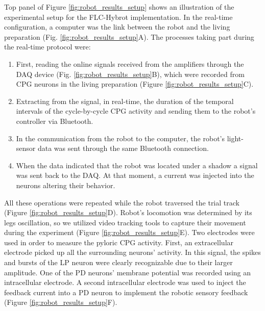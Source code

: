 Top panel of Figure \ref{fig:robot_results_setup} shows an illustration of the experimental setup for the FLC-Hybrot implementation. In the real-time configuration, a computer was the link between the robot and the living preparation (Fig. \ref{fig:robot_results_setup}A). The processes taking part during the real-time protocol were:
\begin{enumerate}
	\item First, reading the online signals received from the amplifiers through the DAQ device (Fig. \ref{fig:robot_results_setup}B), which were recorded from CPG neurons in the living preparation (Figure \ref{fig:robot_results_setup}C).
	\item Extracting from the signal, in real-time, the duration of the temporal intervals of the cycle-by-cycle CPG activity and sending them to the robot's controller via Bluetooth.
	\item In the communication from the robot to the computer, the robot's light-sensor data was sent through the same Bluetooth connection.
	\item When the data indicated that the robot was located under a shadow a signal was sent back to the DAQ. At that moment, a current was injected into the neurons altering their behavior.
\end{enumerate}

All these operations were repeated while the robot traversed the trial track (Figure \ref{fig:robot_results_setup}D). Robot's locomotion was determined by its legs oscillation, so we utilized video tracking tools to capture their movement during the experiment (Figure \ref{fig:robot_results_setup}E). Two electrodes were used in order to measure the pyloric CPG activity. First, an extracellular electrode picked up all the surrounding neurons' activity. In this signal, the spikes and bursts of the LP neuron were clearly recognizable due to their larger amplitude. One of the PD neurons' membrane potential was recorded using an intracellular electrode. A second intracellular electrode was used to inject the feedback current into a PD neuron to implement the robotic sensory feedback (Figure \ref{fig:robot_results_setup}F).

